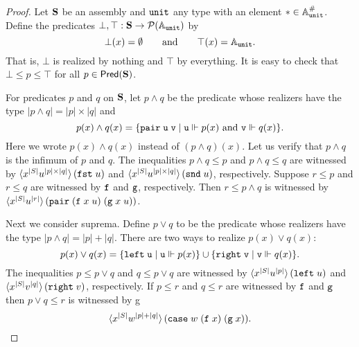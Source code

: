 \begin{proof}
  Let $\mathbf{S}$ be an assembly and $\mathtt{unit}$ any type with an element
  ${*} \in \mathbb{A}^{\#}_{\mathtt{unit}}$. Define the predicates $\bot, \top :
  \mathbf{S} \to \mathcal{P}(\mathbb{A}_{\mathtt{unit}})$ by
  \begin{equation*}
    \bot(x) = \emptyset
    \qquad\text{and}\qquad
    \top(x) = \mathbb{A}_{\mathtt{unit}}.
  \end{equation*}
  That is, $\bot$ is realized by nothing and $\top$ by everything. It is
  easy to check that $\bot \leq p \leq \top$ for all $p \in
  \mathsf{Pred}(\mathbf{S})$.

  For predicates $p$ and $q$ on $\mathbf{S}$, let $p \land q$ be the
  predicate whose realizers have the type $|p \land q| = |p| \times
  |q|$ and
  \begin{equation*}
    p(x) \land q(x) = \{\mathtt{pair}\;\mathtt{u}\;\mathtt{v} \mid
    \text{$\mathtt{u} \Vdash p(x)$ and $\mathtt{v} \Vdash q(x)$}\}.
  \end{equation*}
  Here we wrote $p(x) \land q(x)$ instead of $(p \land q)(x)$. Let us
  verify that $p \land q$ is the infimum of $p$ and $q$. The
  inequalities $p \land q \leq p$ and $p \land q \leq q$ are witnessed
  by $\langle x^{|S|} u^{|p| \times |q|} \rangle\,(\mathtt{fst}\;u)$
  and $\langle x^{|S|} u^{|p| \times
      |q|} \rangle\,(\mathtt{snd}\;u)$, respectively. Suppose $r \leq p$ and $r
  \leq q$ are witnessed by $\mathtt{f}$ and $\mathtt{g}$, respectively. Then $r
  \leq p \land q$ is witnessed by $\langle x^{|S|}
    u^{|r|} \rangle\,(\mathtt{pair}\; (\mathtt{f}\;x\;u)\; (\mathtt{g}\;x\;u))$.

  Next we consider suprema. Define $p \lor q$ to be the predicate
  whose realizers have the type $|p \land q| = |p| + |q|$. There are
  two ways to realize $p(x) \lor q(x)$:
  \begin{equation*}
    p(x) \lor q(x) =
    \{\mathtt{left}\;\mathtt{u} \mid \mathtt{u} \Vdash p(x)\} \cup
    \{\mathtt{right}\;\mathtt{v} \mid \mathtt{v} \Vdash q(x)\}.
  \end{equation*}
  The inequalities $p \leq p \lor q$ and $q \leq p \lor q$ are
  witnessed by $\langle x^{|S|} u^{|p|} \rangle\,(\mathtt{left}\;u)$
  and $\langle x^{|S|} v^{|q|} \rangle\,(\mathtt{right}\;v)$,
  respectively. If $p \leq r$ and $q \leq r$ are witnessed by $\mathtt{f}$
  and $\mathtt{g}$ then $p \lor q \leq r$ is witnessed by
  g
  \begin{equation*}
    \langle x^{|S|} w^{|p|+|q|} \rangle\,(
      \mathtt{case}\;w\;(\mathtt{f}\;x)\;(\mathtt{g}\;x)
    ).
  \end{equation*}
  

\end{proof}
